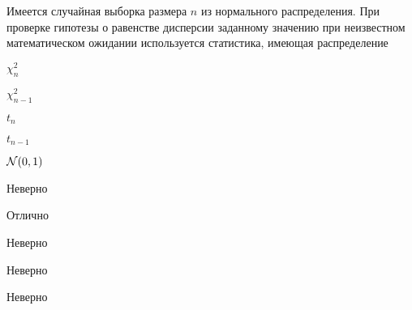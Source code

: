 
\begin{question}
Имеется случайная выборка размера \(n\) из нормального распределения.
При проверке гипотезы о равенстве дисперсии заданному значению при
неизвестном математическом ожидании используется статистика, имеющая
распределение
\begin{answerlist}
  \item \(\chi^2_n\)
  \item \(\chi^2_{n-1}\)
  \item \(t_n\)
  \item \(t_{n-1}\)
  \item \(\mathcal{N}(0,1)\)
\end{answerlist}
\end{question}

\begin{solution}
\begin{answerlist}
  \item Неверно
  \item Отлично
  \item Неверно
  \item Неверно
  \item Неверно
\end{answerlist}
\end{solution}


